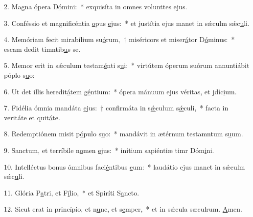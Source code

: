 2. Magna \uline{ó}pera D\uline{ó}mini:~* exquisíta in omnes volunttes \uline{e}jus.\par 
3. Conféssio et magnificéntia \uline{o}pus \uline{e}jus:~* et justítia ejus manet in sǽculm sǽc\uline{u}li.\par 
4. Memóriam fecit mirabílium su\uline{ó}rum,~† miséricors et miser\uline{á}tor D\uline{ó}minus:~* escam dedit timntib\uline{u}s se.\par 
5. Memor erit in sǽculum testam\uline{é}nti s\uline{u}i:~* virtútem óperum suórum annuntiábit póplo s\uline{u}o:\par 
6. Ut det illis heredit\uline{á}tem g\uline{é}ntium:~* ópera mánuum ejus véritas, et jdíc\uline{i}um.\par 
7. Fidélia ómnia mandáta \uline{e}jus:~† confirmáta in s\uline{ǽ}culum s\uline{ǽ}culi,~* facta in veritáte et quit\uline{á}te.\par 
8. Redemptiónem misit p\uline{ó}pulo s\uline{u}o:~* mandávit in ætérnum testamntum s\uline{u}um.\par 
9. Sanctum, et terríbile n\uline{o}men \uline{e}jus:~* inítium sapiéntiæ timr Dóm\uline{i}ni.\par 
10. Intelléctus bonus ómnibus faci\uline{é}ntibus \uline{e}um:~* laudátio ejus manet in sǽculm sǽc\uline{u}li.\par 
11. Glória P\uline{a}tri, et F\uline{í}lio,~* et Spiríti S\uline{a}ncto.\par 
12. Sicut erat in princípio, et n\uline{u}nc, et s\uline{e}mper,~* et in sǽcula sæculrum. \uline{A}men.\par 
